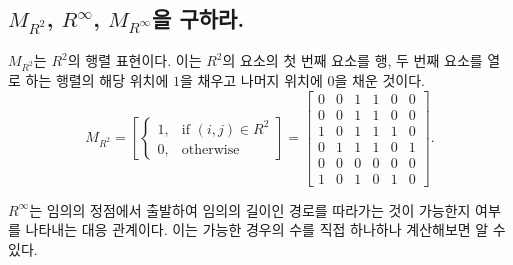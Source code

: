\documentclass{oblivoir}
\begin{document}
\subsection{$M_{R^2}$, $R^\infty$, $M_{R^\infty}$을 구하라.}

$M_{R^2}$는 $R^2$의 행렬 표현이다.
이는 $R^2$의 요소의 첫 번째 요소를 행, 두 번째 요소를 열로 하는
행렬의 해당 위치에 $1$을 채우고 나머지 위치에 $0$을 채운 것이다.
\begin{equation}
    M_{R^2} = \left[ \begin{cases}
        1,& \text{if } (i,j) \in R^2 \\
        0,& \text{otherwise}
    \end{cases} \right] = \begin{bmatrix}
        0 & 0 & 1 & 1 & 0 & 0 \\
        0 & 0 & 1 & 1 & 0 & 0 \\
        1 & 0 & 1 & 1 & 1 & 0 \\
        0 & 1 & 1 & 1 & 0 & 1 \\
        0 & 0 & 0 & 0 & 0 & 0 \\
        1 & 0 & 1 & 0 & 1 & 0
    \end{bmatrix}.
\end{equation}

$R^\infty$는 임의의 정점에서 출발하여
임의의 길이인 경로를 따라가는 것이 가능한지 여부를 나타내는
대응 관계이다.
이는 가능한 경우의 수를 직접 하나하나 계산해보면 알 수 있다.
\end{document}
